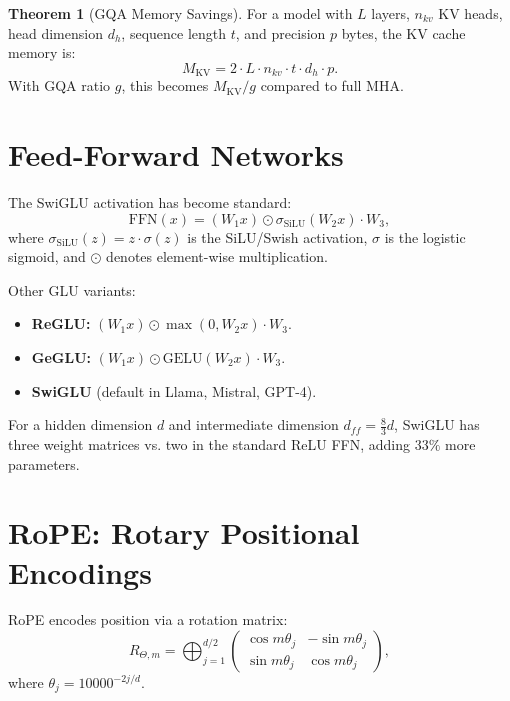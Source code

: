 \documentclass[11pt,a4paper]{book}
\theoremstyle{definition}
\newtheorem{theorem}{Theorem}[chapter]
\begin{document}
\begin{theorem}[GQA Memory Savings]
	For a model with $L$ layers, $n_{kv}$ KV heads, head dimension $d_h$, sequence length $t$, and precision $p$ bytes, the KV cache memory is:
	\begin{equation}
		M_{\text{KV}} = 2 \cdot L \cdot n_{kv} \cdot t \cdot d_h \cdot p.
	\end{equation}
	With GQA ratio $g$, this becomes $M_{\text{KV}} / g$ compared to full MHA.
\end{theorem}

\section{Feed-Forward Networks}

The SwiGLU activation has become standard:
\begin{equation}
	\text{FFN}(x) = (W_1 x) \odot \sigma_{\text{SiLU}}(W_2 x) \cdot W_3,
\end{equation}
where $\sigma_{\text{SiLU}}(z) = z \cdot \sigma(z)$ is the SiLU/Swish activation, $\sigma$ is the logistic sigmoid, and $\odot$ denotes element-wise multiplication.

Other GLU variants:
\begin{itemize}
	\item \textbf{ReGLU:} $(W_1 x) \odot \max(0, W_2 x) \cdot W_3$.
	\item \textbf{GeGLU:} $(W_1 x) \odot \text{GELU}(W_2 x) \cdot W_3$.
	\item \textbf{SwiGLU} (default in Llama, Mistral, GPT-4).
\end{itemize}

For a hidden dimension $d$ and intermediate dimension $d_{ff} = \frac{8}{3}d$, SwiGLU has three weight matrices vs. two in the standard ReLU FFN, adding $33\%$ more parameters.

\section{RoPE: Rotary Positional Encodings}

RoPE encodes position via a rotation matrix:
\begin{equation}
	R_{\Theta,m} = \bigoplus_{j=1}^{d/2} \begin{pmatrix}
		\cos m\theta_j & -\sin m\theta_j \\
		\sin m\theta_j & \cos m\theta_j
	\end{pmatrix},
\end{equation}
where $\theta_j = 10000^{-2j/d}$.
\end{document}
